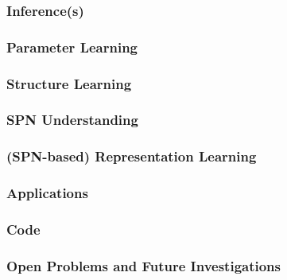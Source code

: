 \documentclass[10pt,t]{beamer}
\begin{document}
\begin{frame}
\frametitle{Inference(s)}
\end{frame}

\begin{frame}
\frametitle{Parameter Learning}
\end{frame}

\begin{frame}
\frametitle{Structure Learning}
\end{frame}

\begin{frame}
\frametitle{SPN Understanding}
\end{frame}

\begin{frame}
\frametitle{(SPN-based) Representation Learning}
\end{frame}


\begin{frame}
\frametitle{Applications}
\end{frame}

\begin{frame}
\frametitle{Code}
\end{frame}



\begin{frame}
\frametitle{Open Problems and Future Investigations}
\end{frame}
\end{document}
